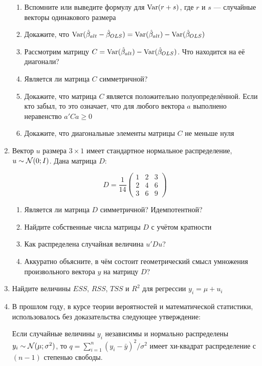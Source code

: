 \documentclass[12pt, a4paper]{article}
\theoremstyle{definition}
\begin{document}
\begin{enumerate}
\begin{enumerate}[resume]
\item Вспомните или выведите формулу для $\operatorname{Var}(r + s)$, где $r$ и $s$ — случайные векторы одинакового размера
\item Докажите, что $\operatorname{Var}(\hat{\beta}_{alt} - \hat{\beta}_{OLS}) = \operatorname{Var}(\hat{\beta}_{alt}) - \operatorname{Var}(\hat{\beta}_{OLS})$
\item Рассмотрим матрицу $C = \operatorname{Var}(\hat{\beta}_{alt}) - \operatorname{Var}(\hat{\beta}_{OLS})$. Что находится на её диагонали?
\item Является ли матрица $C$ симметричной?
\item Докажите, что матрица $C$ является положительно полуопределённой. Если кто забыл, то это означает, что для любого вектора $a$ выполнено неравенство $a'Ca \geq 0$
\item Докажите, что диагональные элементы матрицы $C$ не меньше нуля
\end{enumerate}


\item Вектор $u$ размера $3 \times 1$ имеет стандартное нормальное распределение, $u \sim \mathcal{N} (0; I)$. Дана матрица $D$:

\[
D = \frac{1}{14} \begin{pmatrix}
1 & 2 & 3 \\
2 & 4 & 6 \\
3 & 6 & 9
\end{pmatrix}
\]

\begin{enumerate}
  \item Является ли матрица $D$ симметричной? Идемпотентной?
  \item Найдите собственные числа матрицы $D$ с учётом кратности
  \item Как распределена случайная величина $u'Du$?
  \item Аккуратно объясните, в чём состоит геометрический смысл умножения произвольного вектора $y$ на матрицу $D$?
\end{enumerate}

\item Найдите величины $ESS$, $RSS$, $TSS$ и $R^2$ для регрессии $y_i = \mu + u_i$

\item В прошлом году, в курсе теории вероятностей и математической статистики, использовалось без доказательства следующее утверждение:

Если случайные величины $y_i$ независимы и нормально распределены $y_i \sim \mathcal{N} (\mu; \sigma^2)$, то $q = \sum_{i=1}^n (y_i - \bar y)^2 / \sigma^2$ имеет хи-квадрат распределение с $(n - 1)$ степенью свободы.


\end{enumerate}
\end{document}
